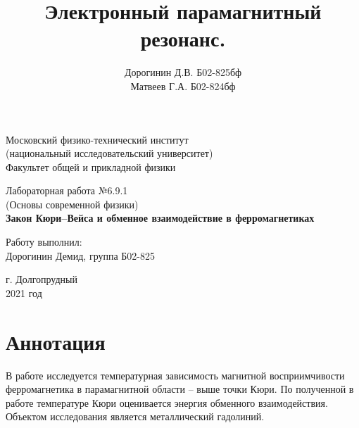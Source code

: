 \documentclass[a4paper,12pt]{article}
\date{\vspace{-10pt}}
\author{Дорогинин Д.В. Б02-825бф\\
Матвеев Г.А. Б02-824бф}
\title{\textbf{Электронный парамагнитный резонанс.}}
\theoremstyle{definition}
\begin{document}
\begin{titlepage}
	\begin{center}
		\large 	Московский физико-технический институт \\
		(национальный исследовательский университет) \\
		Факультет общей и прикладной физики \\
		\vspace{0.2cm}
		
		\vspace{4.5cm}
		Лабораторная работа №6.9.1  \\ \vspace{0.2cm}
		\large (Основы современной физики) \\ \vspace{0.2cm}
		\LARGE \textbf{ Закон Кюри--Вейса и обменное взаимодействие в
ферромагнетиках  }
	\end{center}
	\vspace{2.3cm} \large
	
	\begin{center}
		Работу выполнил: \\
		Дорогинин Демид,
		группа Б02-825
		\vspace{10mm}			
	\end{center}
		
	\begin{center} \vspace{60mm}
		г. Долгопрудный \\
		2021 год
	\end{center}
\end{titlepage}


\section*{Аннотация}
В работе исследуется температурная зависимость магнитной восприимчивости ферромагнетика в парамагнитной области -- выше точки Кюри. По полученной в работе температуре Кюри оценивается энергия обменного взаимодействия. Объектом исследования является металлический гадолиний.
\end{document}
